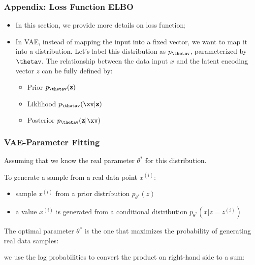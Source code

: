 \documentclass[11pt,compress,t,notes=noshow, xcolor=table]{beamer}
\begin{document}
\begin{frame}
\frametitle{Appendix: Loss Function ELBO }

\begin{itemize}
\item In this section, we provide more details on loss function; 
\item In VAE, instead of mapping the input into a fixed vector, we want to map it into a distribution. Let's label this distribution as $p_{\thetav}$, parameterized by ${\thetav}$. The relationship between the data input $x$ and the latent encoding vector $z$ can be fully defined by:

  \begin{itemize}
    \item Prior $p_{\thetav}(\mathbf{z})$
    \item Liklihood $p_{\thetav}( \xv|\mathbf{z})$
    \item Posterior $p_{\thetav}(\mathbf{z} | \xv)$
  \end{itemize}
\end{itemize}

\end{frame}



\begin{frame}
\frametitle{VAE-Parameter Fitting}
\vspace{2mm}

Assuming that we know the real parameter ${\theta}^*$ for this distribution. 

To generate a sample from a real data point $x^{(i)}$:

\begin{itemize}
\item sample $x^{(i)}$ from a prior distribution $p_{{\theta}^*} (z)$
\item a value $x^{(i)}$ is generated from a conditional distribution $p_{{\theta}^*} (x|z=z^{(i)})$ 
\end{itemize}

\vspace{1mm}
The optimal parameter ${\theta}^*$ is the one that maximizes the probability of generating real data samples:

\vspace{2mm}
\vspace{2mm}

we use the log probabilities to convert the product on right-hand side to a sum:

\vspace{2mm}

\end{frame}  
\end{document}
